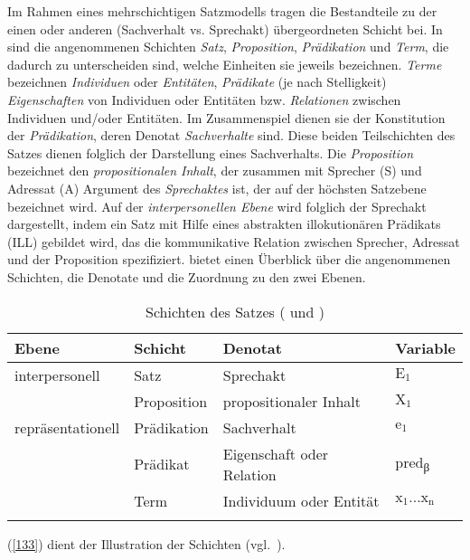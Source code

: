 Im Rahmen eines mehrschichtigen Satzmodells tragen die Bestandteile zu der einen oder anderen (Sachverhalt vs. Sprechakt) übergeordneten Schicht bei. In \citet[4]{Hengeveld1990} sind die angenommenen  Schichten \textit{Satz}, \textit{Proposition}, \textit{Prädikation} und  \textit{Term}, die dadurch  zu  unterscheiden sind, welche Einheiten sie jeweils bezeichnen. \textit{Terme} bezeichnen \textit{Individuen} oder \textit{Entitäten}, \textit{Prädikate} (je nach Stelligkeit) \textit{Eigenschaften} von Individuen oder Entitäten bzw. \textit{Relationen} zwischen Individuen und/oder Entitäten. Im Zusammenspiel dienen sie der Konstitution der \textit{Prädikation}, deren Denotat \textit{Sachverhalte} sind. Diese beiden Teilschichten des Satzes dienen folglich der Darstellung eines Sachverhalts. Die \textit{Proposition} be\-zeichnet den \textit{propositionalen Inhalt}, der zusammen mit Sprecher (S) und Adressat (A) Argument des \textit{Sprechaktes} ist, der auf der höchsten Satzebene bezeichnet wird. Auf der \textit{interpersonellen Ebene} wird folglich der Sprechakt dargestellt, indem ein Satz mit Hilfe eines abstrakten illokutionären Prädikats (ILL) gebildet wird, das die kommunikative Relation zwischen Sprecher, Adressat und der Proposition spezifiziert.  bietet einen Überblick über die angenommenen Schichten, die Denotate und die Zuordnung zu den zwei Ebenen.

\begin{table}
	\caption{\label{tab:132}Schichten des Satzes (\citealt[46]{Dik1989} und \citealt[130]{Hengeveld1989})}
     \begin{tabular}[t]{llll}
     		\lsptoprule
     		Ebene & Schicht & Denotat & Variable\\
            \midrule
            interpersonell & Satz & Sprechakt & $\textrm{{E}}_{\textrm{1}}$\\
             & Proposition & propositionaler Inhalt & $\textrm{X}_{\textrm{1}}$\\
             repräsentationell & Prädikation & Sachverhalt & $\textrm{e}_{\textrm{1}}$\\
             & Prädikat & Eigenschaft oder Relation & pred\textsubscript{β}\\
             & Term & Individuum oder Entität & $\textrm{x}_{\textrm{1}}...\textrm{x}_{\textrm{n}}$\\
       		 \lspbottomrule
      \end{tabular}
\end{table}
(\ref{133}) dient der Illustration der Schichten (vgl.\ \citealt[4]{Hengeveld1990}).

